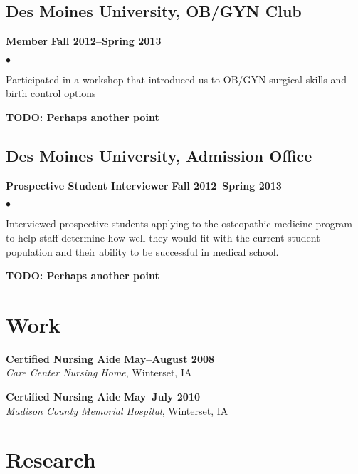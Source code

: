 \documentclass[10pt,letterpaper]{article}
\renewenvironment{itemize}{
  \begin{list}{}{
      \setlength{\leftmargin}{1.5em}
      \setlength{\itemsep}{0.25em}
      \setlength{\parskip}{0pt}
      \setlength{\parsep}{0.25em}
    }
  }{
  \end{list}
}
\newenvironment{bitemize}{
  \begin{list}{$\bullet$}{
      \setlength{\leftmargin}{1.5em}
      \setlength{\itemsep}{0.25em}
      \setlength{\parskip}{0pt}
      \setlength{\parsep}{0.25em}
    }
  }{
  \end{list}
}
\begin{document}
\subsection*{Des Moines University, OB/GYN Club}
\begin{itemize}
\item \textbf{Member} \hfill \textbf{Fall 2012--Spring 2013}
  \begin{bitemize}
  \item Participated in a workshop that introduced us to OB/GYN surgical
  skills and birth control options
  \item \textbf{TODO: Perhaps another point}
  \end{bitemize}
\end{itemize}

\subsection*{Des Moines University, Admission Office}
\begin{itemize}
\item \textbf{Prospective Student Interviewer} \hfill \textbf{Fall 2012--Spring 2013}
  \begin{bitemize}
  \item Interviewed prospective students applying to the osteopathic
    medicine program to help staff determine how well they would fit
    with the current student population and their ability to be
    successful in medical school.
  \item \textbf{TODO: Perhaps another point}
  \end{bitemize}
\end{itemize}

\section*{Work}

\begin{itemize}
\item \textbf{Certified Nursing Aide} \hfill \textbf{May--August 2008}\\
  \textit{Care Center Nursing Home}, Winterset, IA
\item \textbf{Certified Nursing Aide} \hfill \textbf{May--July 2010}\\
  \textit{Madison County Memorial Hospital}, Winterset, IA
\end{itemize}

\section*{Research}
\end{document}
